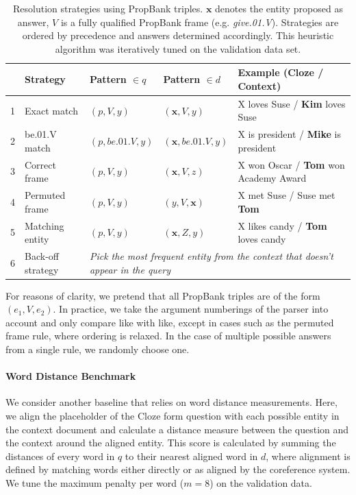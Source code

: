 \begin{table}[h]\footnotesize
  \centering
  \begin{tabular}{@{}rllll@{}}
    \toprule
    & Strategy & Pattern $\in q$ & Pattern $\in d$ & Example (Cloze / Context) \\
    \midrule
    1 & Exact match & $(p,V,y)$ & $(\bm{x},V,y)$ & X loves Suse / \textbf{Kim} loves Suse \\
    2 & be.01.V match & $(p,\textit{be.01.V},y)$ & $(\bm{x},\textit{be.01.V},y)$ & X is president / \textbf{Mike} is president \\
    3 & Correct frame & $(p,V,y)$ & $(\bm{x},V,z)$ & X won Oscar / \textbf{Tom} won Academy Award \\
    4 & Permuted frame & $(p,V,y)$ & $(y,V,\bm{x})$ & X met Suse / Suse met \textbf{Tom} \\
    5 & Matching entity & $(p,V,y)$ & $(\bm{x},Z,y)$ & X likes candy / \textbf{Tom} loves candy \\
    6 & Back-off strategy & \multicolumn{3}{l}{\textit{Pick the most frequent entity from the context that doesn't appear in the query}} \\
    \bottomrule
  \end{tabular}
  \caption{Resolution strategies using PropBank triples. $\bm{x}$ denotes the
    entity proposed as answer, $V$ is a fully qualified PropBank frame (e.g.
    \textit{give.01.V}). Strategies are ordered by precedence and answers
    determined accordingly. This heuristic algorithm was iteratively
    tuned on the validation data set.
    \label{tab:fsp}
  }
\end{table}

For reasons of clarity, we pretend that all PropBank triples are of the form
$(e_1,V,e_2)$. In practice, we take the argument numberings of the parser into
account and only compare like with like, except in cases such as the permuted
frame rule, where ordering is relaxed. In the case of multiple possible answers
from a single rule, we randomly choose one.

\paragraph{Word Distance Benchmark}

We consider another baseline that relies on word distance measurements. Here, we
align the placeholder of the Cloze form question with each possible entity in
the context document and calculate a distance measure between the question and the
context around the aligned entity.
This score is calculated by summing the distances of every word in $q$
to their nearest aligned word in $d$, where alignment is defined by matching
words either directly or as aligned by the coreference system. We tune the
maximum penalty per word ($m=8$) on the validation data.

